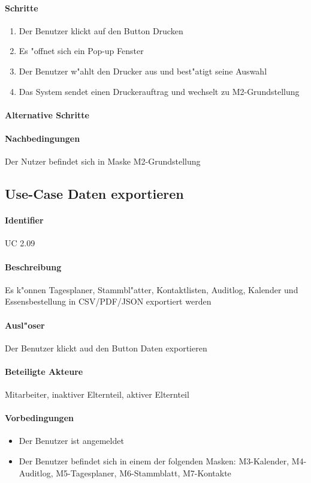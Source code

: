  \paragraph{Schritte}
  \begin{enumerate}
   \item Der Benutzer klickt auf den Button \dq Drucken \dq
   \item Es "offnet sich ein Pop-up Fenster
   \item Der Benutzer w"ahlt den Drucker aus und best"atigt seine Auswahl
   \item Das System sendet einen Druckerauftrag und wechselt zu M2-Grundstellung
  \end{enumerate}
  \paragraph{Alternative Schritte}
  \paragraph{Nachbedingungen}
  Der Nutzer befindet sich in Maske M2-Grundstellung

  
  \newpage
 \subsection{Use-Case Daten exportieren}
  \paragraph{Identifier}
  UC 2.09
  \paragraph{Beschreibung}
    Es k"onnen Tagesplaner, Stammbl"atter, Kontaktlisten, Auditlog, Kalender und Essensbestellung in CSV/PDF/JSON exportiert werden
  \paragraph{Ausl"oser}
    Der Benutzer klickt aud den Button \dq Daten exportieren\dq

  \paragraph{Beteiligte Akteure}   \leavevmode \newline
    Mitarbeiter, inaktiver Elternteil, aktiver Elternteil
  \paragraph{Vorbedingungen}
    \begin{itemize}
   \item Der Benutzer ist angemeldet
   \item Der Benutzer befindet sich in einem der folgenden Masken: M3-Kalender, M4-Auditlog, M5-Tagesplaner, M6-Stammblatt, M7-Kontakte
  \end{itemize}
